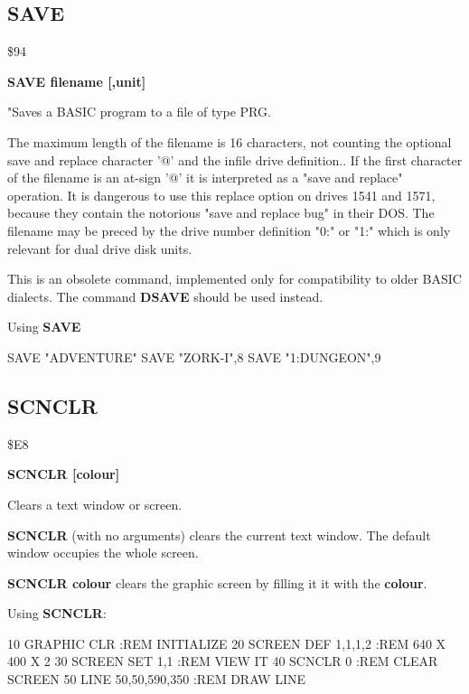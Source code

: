 \subsection{SAVE}
\begin{description}[leftmargin=3cm,style=nextline]
\item [Token:] \$94
\item [Format:] {\bf SAVE filename [,unit] }
\item [Usage:]
   "Saves a BASIC program to a file of type PRG.

   \filenamedefinition
   The maximum length of the filename is 16 characters,
   not counting the optional save and replace character '@'
   and the infile drive definition..
   If the first character of the filename is an at-sign '@' it
   is interpreted as a "save and replace" operation. It is dangerous
   to use this replace option on drives 1541 and 1571, because they
   contain the notorious "save and replace bug" in their DOS.
   The filename may be preced by the drive number definition
   "0:" or "1:" which is only relevant for dual drive disk units.

   \unitdefinition

\item [Remarks:]
   This is an obsolete command, implemented only for compatibility
   to older BASIC dialects. The command {\bf DSAVE} should be used
   instead.

\item [Example:] Using {\bf SAVE}
\begin{screenoutput}
  SAVE "ADVENTURE"
  SAVE "ZORK-I",8
  SAVE "1:DUNGEON",9
\end{screenoutput}
\end{description}


\newpage
\subsection{SCNCLR}
\begin{description}[leftmargin=3cm,style=nextline]
\item [Token:] \$E8
\item [Format:] {\bf SCNCLR [colour]}
\item [Usage:] Clears a text window or screen.

               {\bf SCNCLR} (with no arguments) clears the
               current text window. The default window
               occupies the whole screen.

               {\bf SCNCLR colour} clears the graphic screen by
               filling it it with the {\bf colour}.

\item [Example:] Using {\bf SCNCLR}:
\begin{screenoutput}
 10 GRAPHIC CLR         :REM INITIALIZE
 20 SCREEN DEF 1,1,1,2  :REM 640 X 400 X 2
 30 SCREEN SET 1,1      :REM VIEW IT
 40 SCNCLR 0            :REM CLEAR SCREEN
 50 LINE 50,50,590,350  :REM DRAW LINE
\end{screenoutput}
\end{description}

